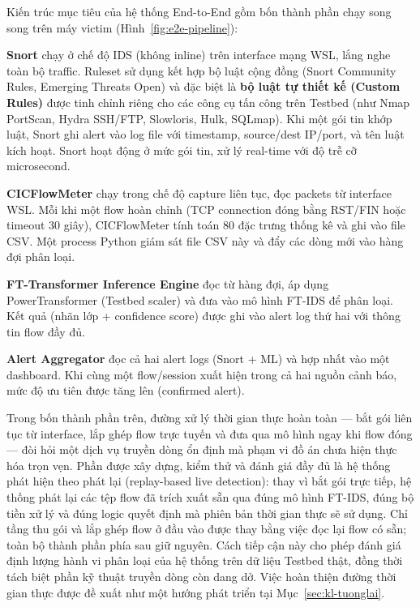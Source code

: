 \documentclass[../DoAn.tex]{subfiles}
\begin{document}
Kiến trúc mục tiêu của hệ thống End-to-End gồm bốn thành phần chạy song song trên máy victim (Hình~\ref{fig:e2e-pipeline}):

\textbf{Snort} chạy ở chế độ IDS (không inline) trên interface mạng WSL, lắng nghe toàn bộ traffic. Ruleset sử dụng kết hợp bộ luật cộng đồng (Snort Community Rules, Emerging Threats Open) và đặc biệt là \textbf{bộ luật tự thiết kế (Custom Rules)} được tinh chỉnh riêng cho các công cụ tấn công trên Testbed (như Nmap PortScan, Hydra SSH/FTP, Slowloris, Hulk, SQLmap). Khi một gói tin khớp luật, Snort ghi alert vào log file với timestamp, source/dest IP/port, và tên luật kích hoạt. Snort hoạt động ở mức gói tin, xử lý real-time với độ trễ cỡ microsecond.

\textbf{CICFlowMeter} chạy trong chế độ capture liên tục, đọc packets từ interface WSL. Mỗi khi một flow hoàn chỉnh (TCP connection đóng bằng RST/FIN hoặc timeout 30 giây), CICFlowMeter tính toán 80 đặc trưng thống kê và ghi vào file CSV. Một process Python giám sát file CSV này và đẩy các dòng mới vào hàng đợi phân loại.

\textbf{FT-Transformer Inference Engine} đọc từ hàng đợi, áp dụng PowerTransformer (Testbed scaler) và đưa vào mô hình FT-IDS để phân loại. Kết quả (nhãn lớp + confidence score) được ghi vào alert log thứ hai với thông tin flow đầy đủ.

\textbf{Alert Aggregator} đọc cả hai alert logs (Snort + ML) và hợp nhất vào một dashboard. Khi cùng một flow/session xuất hiện trong cả hai nguồn cảnh báo, mức độ ưu tiên được tăng lên (confirmed alert).

Trong bốn thành phần trên, đường xử lý thời gian thực hoàn toàn --- bắt gói liên tục từ interface, lắp ghép flow trực tuyến và đưa qua mô hình ngay khi flow đóng --- đòi hỏi một dịch vụ truyền dòng ổn định mà phạm vi đồ án chưa hiện thực hóa trọn vẹn. Phần được xây dựng, kiểm thử và đánh giá đầy đủ là hệ thống phát hiện theo phát lại (replay-based live detection): thay vì bắt gói trực tiếp, hệ thống phát lại các tệp flow đã trích xuất sẵn qua đúng mô hình FT-IDS, đúng bộ tiền xử lý và đúng logic quyết định mà phiên bản thời gian thực sẽ sử dụng. Chỉ tầng thu gói và lắp ghép flow ở đầu vào được thay bằng việc đọc lại flow có sẵn; toàn bộ thành phần phía sau giữ nguyên. Cách tiếp cận này cho phép đánh giá định lượng hành vi phân loại của hệ thống trên dữ liệu Testbed thật, đồng thời tách biệt phần kỹ thuật truyền dòng còn dang dở. Việc hoàn thiện đường thời gian thực được đề xuất như một hướng phát triển tại Mục~\ref{sec:kl-tuonglai}.
\end{document}
